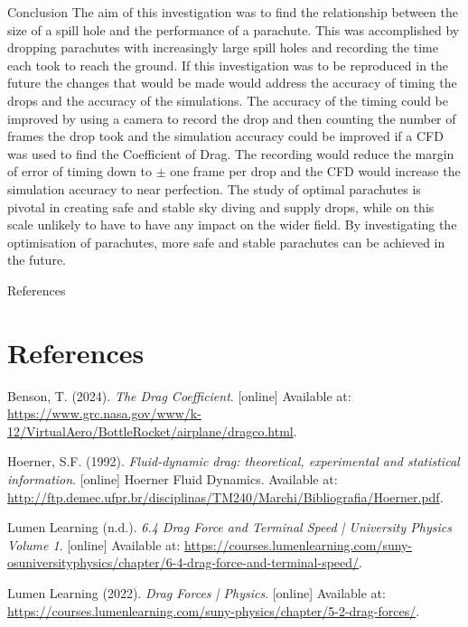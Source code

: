 \documentclass[final]{beamer}
\newlength{\colwidth}
\begin{document}
\begin{frame}[t]
\begin{columns}[t]
\begin{column}{\colwidth}
  \begin{block}{Conclusion}
The aim of this investigation was to find the relationship between the size of a spill hole and the performance of a parachute. This was accomplished by dropping parachutes with increasingly large spill holes and recording the time each took to reach the ground. If this investigation was to be reproduced in the future the changes that would be made would address the accuracy of timing the drops and the accuracy of the simulations. The accuracy of the timing could be improved by using a camera to record the drop and then counting the number of frames the drop took and the simulation accuracy could be  improved if a CFD was used to find the Coefficient of Drag. The recording would reduce the margin of error of timing down to $\pm $ one frame per drop and the CFD would increase the simulation accuracy to near perfection. The study of optimal parachutes is pivotal in creating safe and stable sky diving and supply drops, while on this scale unlikely to have to have any impact on the wider field. By investigating the optimisation of parachutes, more safe and stable parachutes can be achieved in the future.
  \end{block}

  \begin{block}{References}

\section*{References}
\begingroup
\footnotesize
\begin{thebibliography}{9}

Benson, T. (2024). \emph{The Drag Coefficient}. [online] Available at: \url{https://www.grc.nasa.gov/www/k-12/VirtualAero/BottleRocket/airplane/dragco.html}.

Hoerner, S.F. (1992). \emph{Fluid-dynamic drag: theoretical, experimental and statistical information}. [online] Hoerner Fluid Dynamics. Available at: \url{http://ftp.demec.ufpr.br/disciplinas/TM240/Marchi/Bibliografia/Hoerner.pdf}.

Lumen Learning (n.d.). \emph{6.4 Drag Force and Terminal Speed | University Physics Volume 1}. [online] Available at: \url{https://courses.lumenlearning.com/suny-osuniversityphysics/chapter/6-4-drag-force-and-terminal-speed/}.

Lumen Learning (2022). \emph{Drag Forces | Physics}. [online] Available at: \url{https://courses.lumenlearning.com/suny-physics/chapter/5-2-drag-forces/}.


\end{thebibliography}
\end{block}
\end{column}
\end{columns}
\end{frame}
\end{document}
